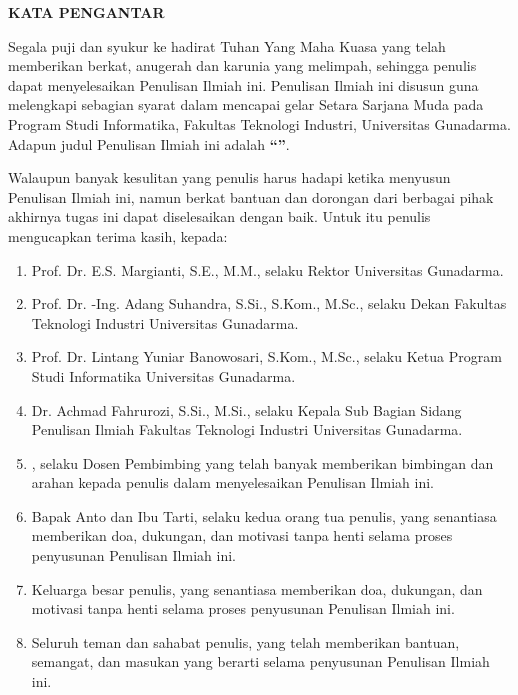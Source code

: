 
\thispagestyle{chapterpage}

\begin{center}
  {\bfseries\fontsize{14}{14}\selectfont KATA PENGANTAR}
\end{center}

\vspace{2\baselineskip}

Segala puji dan syukur ke hadirat Tuhan Yang Maha Kuasa yang telah memberikan
berkat, anugerah dan karunia yang melimpah, sehingga penulis dapat menyelesaikan
Penulisan Ilmiah ini. Penulisan Ilmiah ini disusun guna melengkapi sebagian syarat dalam
mencapai gelar Setara Sarjana Muda pada Program Studi Informatika, Fakultas Teknologi
Industri, Universitas Gunadarma. Adapun judul Penulisan Ilmiah ini adalah
\textbf{``\JudulPISatu''}.

Walaupun banyak kesulitan yang penulis harus hadapi ketika menyusun Penulisan Ilmiah
ini, namun berkat bantuan dan dorongan dari berbagai pihak akhirnya tugas ini dapat
diselesaikan dengan baik. Untuk itu penulis mengucapkan terima kasih, kepada:

\begin{enumerate}
  \item Prof. Dr. E.S. Margianti, S.E., M.M., selaku Rektor Universitas Gunadarma.
  \item Prof. Dr. -Ing. Adang Suhandra, S.Si., S.Kom., M.Sc., selaku Dekan Fakultas
        Teknologi Industri Universitas Gunadarma.
  \item Prof. Dr. Lintang Yuniar Banowosari, S.Kom., M.Sc., selaku Ketua Program Studi
        Informatika Universitas Gunadarma.
  \item Dr. Achmad Fahrurozi, S.Si., M.Si., selaku Kepala Sub Bagian Sidang Penulisan
        Ilmiah Fakultas Teknologi Industri Universitas Gunadarma.
  \item \NamaPembimbing, selaku Dosen Pembimbing yang telah banyak memberikan
        bimbingan dan arahan kepada penulis dalam menyelesaikan Penulisan Ilmiah ini.
  \item Bapak Anto dan Ibu Tarti, selaku kedua orang tua penulis, yang senantiasa
        memberikan doa, dukungan, dan motivasi tanpa henti selama proses penyusunan
        Penulisan Ilmiah ini.
  \item Keluarga besar penulis, yang senantiasa memberikan doa, dukungan,
        dan motivasi tanpa henti selama proses penyusunan Penulisan Ilmiah ini.
  \item Seluruh teman dan sahabat penulis, yang telah memberikan bantuan, semangat, dan
        masukan yang berarti selama penyusunan Penulisan Ilmiah ini.
\end{enumerate}


